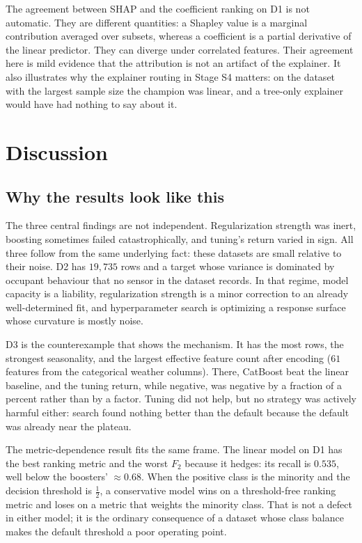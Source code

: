 \documentclass{ieeeaccess}
\begin{document}
The agreement between SHAP and the coefficient ranking on D1 is not automatic. They are different quantities: a Shapley value is a marginal contribution averaged over subsets, whereas a coefficient is a partial derivative of the linear predictor. They can diverge under correlated features. Their agreement here is mild evidence that the attribution is not an artifact of the explainer. It also illustrates why the explainer routing in Stage S4 matters: on the dataset with the largest sample size the champion was linear, and a tree-only explainer would have had nothing to say about it.

\section{Discussion}
\label{sec:discussion}

\subsection{Why the results look like this}
The three central findings are not independent. Regularization strength was inert, boosting sometimes failed catastrophically, and tuning's return varied in sign. All three follow from the same underlying fact: these datasets are small relative to their noise. D2 has $19{,}735$ rows and a target whose variance is dominated by occupant behaviour that no sensor in the dataset records. In that regime, model capacity is a liability, regularization strength is a minor correction to an already well-determined fit, and hyperparameter search is optimizing a response surface whose curvature is mostly noise.

D3 is the counterexample that shows the mechanism. It has the most rows, the strongest seasonality, and the largest effective feature count after encoding ($61$ features from the categorical weather columns). There, CatBoost beat the linear baseline, and the tuning return, while negative, was negative by a fraction of a percent rather than by a factor. Tuning did not help, but no strategy was actively harmful either: search found nothing better than the default because the default was already near the plateau.

The metric-dependence result fits the same frame. The linear model on D1 has the best ranking metric and the worst $F_2$ because it hedges: its recall is $0.535$, well below the boosters' $\approx 0.68$. When the positive class is the minority and the decision threshold is $\tfrac{1}{2}$, a conservative model wins on a threshold-free ranking metric and loses on a metric that weights the minority class. That is not a defect in either model; it is the ordinary consequence of a dataset whose class balance makes the default threshold a poor operating point.
\end{document}
